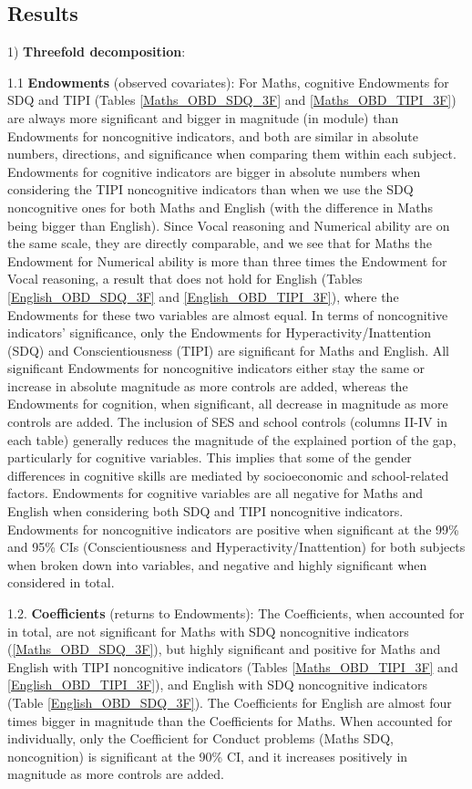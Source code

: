 \documentclass[12pt,a4paper,onecolumn]{article}
\numberwithin{equation}{section}
\begin{document}
\subsection{Results}
1) \textbf{Threefold decomposition}:

1.1 \textbf{Endowments} (observed covariates): For Maths, cognitive Endowments for SDQ and TIPI (Tables \ref{Maths_OBD_SDQ_3F} and \ref{Maths_OBD_TIPI_3F}) are always more significant and bigger in magnitude (in module) than Endowments for noncognitive indicators, and both are similar in absolute numbers, directions, and significance when comparing them within each subject. Endowments for cognitive indicators are bigger in absolute numbers when considering the TIPI noncognitive indicators than when we use the SDQ noncognitive ones for both Maths and English (with the difference in Maths being bigger than English). Since Vocal reasoning and Numerical ability are on the same scale, they are directly comparable, and we see that for Maths the Endowment for Numerical ability is more than three times the Endowment for Vocal reasoning, a result that does not hold for English (Tables \ref{English_OBD_SDQ_3F} and \ref{English_OBD_TIPI_3F}), where the Endowments for these two variables are almost equal. In terms of noncognitive indicators' significance, only the Endowments for Hyperactivity/Inattention (SDQ) and Conscientiousness (TIPI) are significant for Maths and English. All significant Endowments for noncognitive indicators either stay the same or increase in absolute magnitude as more controls are added, whereas the Endowments for cognition, when significant, all decrease in magnitude as more controls are added. The inclusion of SES and school controls (columns II-IV in each table) generally reduces the magnitude of the explained portion of the gap, particularly for cognitive variables. This implies that some of the gender differences in cognitive skills are mediated by socioeconomic and school-related factors. Endowments for cognitive variables are all negative for Maths and English when considering both SDQ and TIPI noncognitive indicators. Endowments for noncognitive indicators are positive when significant at the 99\% and 95\% CIs (Conscientiousness and Hyperactivity/Inattention) for both subjects when broken down into variables, and negative and highly significant when considered in total.

1.2. \textbf{Coefficients} (returns to Endowments): The Coefficients, when accounted for in total, are not significant for Maths with SDQ noncognitive indicators (\ref{Maths_OBD_SDQ_3F}), but highly significant and positive for Maths and English with TIPI noncognitive indicators (Tables \ref{Maths_OBD_TIPI_3F} and \ref{English_OBD_TIPI_3F}), and English with SDQ noncognitive indicators (Table \ref{English_OBD_SDQ_3F}). The Coefficients for English are almost four times bigger in magnitude than the Coefficients for Maths. When accounted for individually, only the Coefficient for Conduct problems (Maths SDQ, noncognition) is significant at the 90\% CI, and it increases positively in magnitude as more controls are added.
\end{document}
